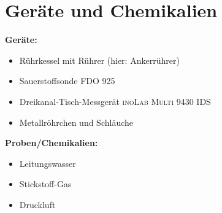 \section{Geräte und Chemikalien}
\label{sec:geraete}

\textbf{Geräte:}
\begin{itemize}
\item Rührkessel mit Rührer (hier: Ankerrührer)
\item Sauerstoffsonde \textsc{FDO\textsuperscript{\textregistered} 925} 
\item Dreikanal-Tisch-Messgerät \textsc{inoLab\textsuperscript{\textregistered} Multi 9430 IDS} 
\item Metallröhrchen und Schläuche
\end{itemize}

\vspace*{5mm}

\textbf{Proben/Chemikalien:}
\begin{itemize}
\item Leitungswasser
\item Stickstoff-Gas 
\item Druckluft
\end{itemize}





